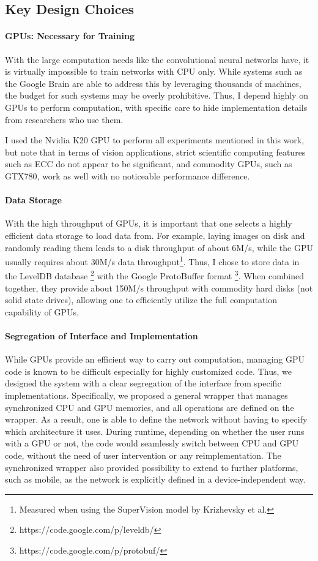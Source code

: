 \subsection{Key Design Choices}
\paragraph{GPUs: Necessary for Training} With the large computation needs like the convolutional neural networks have, it is virtually impossible to train networks with CPU only. While systems such as the Google Brain \cite{le2012icml} are able to address this by leveraging thousands of machines, the budget for such systems may be overly prohibitive. Thus, I depend highly on GPUs to perform computation, with specific care to hide implementation details from researchers who use them.

I used the Nvidia K20 GPU to perform all experiments mentioned in this work, but note that in terms of vision applications, strict scientific computing features such as ECC do not appear to be significant, and commodity GPUs, such as GTX780, work as well with no noticeable performance difference.

\paragraph{Data Storage} With the high throughput of GPUs, it is important that one selects a highly efficient data storage to load data from. For example, laying images on disk and randomly reading them leads to a disk throughput of about 6M/s, while the GPU usually requires about 30M/s data throughput\footnote{Measured when using the SuperVision model by Krizhevsky et al.}. Thus, I chose to store data in the LevelDB database \footnote{https://code.google.com/p/leveldb/} with the Google ProtoBuffer format \footnote{https://code.google.com/p/protobuf/}. When combined together, they provide about 150M/s throughput with commodity hard disks (not solid state drives), allowing one to efficiently utilize the full computation capability of GPUs.

\paragraph{Segregation of Interface and Implementation} While GPUs provide an efficient way to carry out computation, managing GPU code is known to be difficult especially for highly customized code. Thus, we designed the system with a clear segregation of the interface from specific implementations. Specifically, we proposed a general wrapper that manages synchronized CPU and GPU memories, and all operations are defined on the wrapper. As a result, one is able to define the network without having to specify which architecture it uses. During runtime, depending on whether the user runs with a GPU or not, the code would seamlessly switch between CPU and GPU code, without the need of user intervention or any reimplementation. The synchronized wrapper also provided possibility to extend to further platforms, such as mobile, as the network is explicitly defined in a device-independent way.


